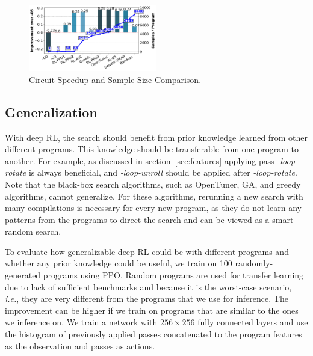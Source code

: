 
\begin{figure}[!t]
    \centering
    \includegraphics[width=0.5\textwidth]{Figures/train_result.pdf}
    \vspace{-0.5cm}
    \caption{Circuit Speedup and Sample Size Comparison.}
    \label{fig:train_result}
\end{figure}


\subsection{Generalization}

With deep RL, the search should benefit from prior knowledge learned from other different programs. This knowledge should be transferable from one program to another. For example, as discussed in section~\ref{sec:features} applying pass \textit{-loop-rotate} is always beneficial, and \textit{-loop-unroll} should be applied after \textit{-loop-rotate}. Note that the black-box search algorithms, such as OpenTuner, GA, and greedy algorithms, cannot generalize. For these algorithms, rerunning a new search with many compilations is necessary for every new program, as they do not learn any patterns from the programs to direct the search and can be viewed as a smart random search. %

To evaluate how generalizable deep RL could be with different programs and whether any prior knowledge could be useful, we train on 100 randomly-generated programs using PPO. Random programs are used for transfer learning due to lack of sufficient benchmarks and because it is the worst-case scenario, \textit{i.e.}, they are very different from the programs that we use for inference. The improvement can be higher if we train on programs that are similar to the ones we inference on. We train a network with $256\times256$ fully connected layers and use the histogram of previously applied passes concatenated to the program features as the observation and passes as actions. 


